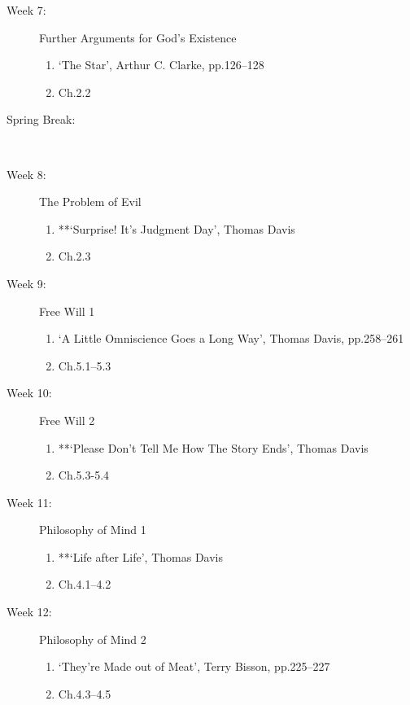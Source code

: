\documentclass[article,oneside]{memoir}
\begin{document}
\begin{description}
\item[Week 7:] Further Arguments for God's Existence
\begin{enumerate}
\item `The Star', Arthur C. Clarke, pp.126--128
\item Ch.2.2
\end{enumerate}

\item[Spring Break:]\

\item[Week 8:] The Problem of Evil 
\begin{enumerate}
\item **`Surprise! It's Judgment Day', Thomas Davis
\item Ch.2.3
\end{enumerate}



\item[Week 9:] Free Will 1
\begin{enumerate}
\item `A Little Omniscience Goes a Long Way', Thomas Davis, pp.258--261
\item Ch.5.1--5.3
\end{enumerate}

\item[Week 10:] Free Will 2
\begin{enumerate}
\item **`Please Don't Tell Me How The Story Ends', Thomas Davis
\item Ch.5.3-5.4
\end{enumerate}


\item[Week 11:] Philosophy of Mind 1
\begin{enumerate}
\item **`Life after Life', Thomas Davis
\item Ch.4.1--4.2
\end{enumerate}


\item[Week 12:] Philosophy of Mind 2
\begin{enumerate}
\item `They're Made out of Meat', Terry Bisson, pp.225--227
\item Ch.4.3--4.5
\end{enumerate}


\end{description}
\end{document}
